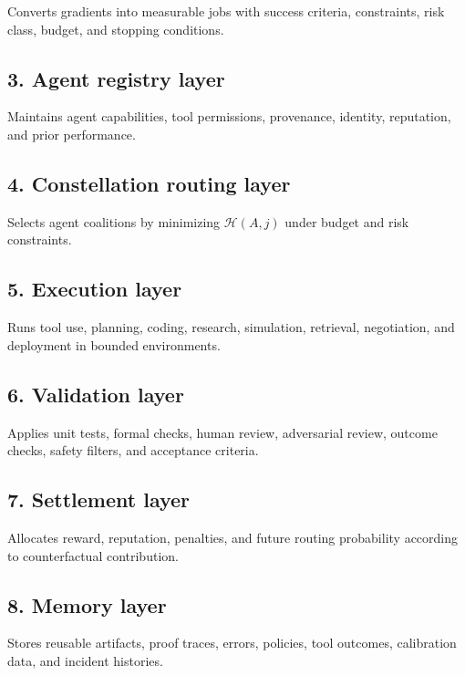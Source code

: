\documentclass[11pt]{article}
\begin{document}
Converts gradients into measurable jobs with success criteria, constraints, risk class, budget, and stopping conditions.

\subsection{3. Agent registry layer}\label{agent-registry-layer}

Maintains agent capabilities, tool permissions, provenance, identity, reputation, and prior performance.

\subsection{4. Constellation routing layer}\label{constellation-routing-layer}

Selects agent coalitions by minimizing \(\mathcal{H}(A,j)\) under budget and risk constraints.

\subsection{5. Execution layer}\label{execution-layer}

Runs tool use, planning, coding, research, simulation, retrieval, negotiation, and deployment in bounded environments.

\subsection{6. Validation layer}\label{validation-layer}

Applies unit tests, formal checks, human review, adversarial review, outcome checks, safety filters, and acceptance criteria.

\subsection{7. Settlement layer}\label{settlement-layer}

Allocates reward, reputation, penalties, and future routing probability according to counterfactual contribution.

\subsection{8. Memory layer}\label{memory-layer}

Stores reusable artifacts, proof traces, errors, policies, tool outcomes, calibration data, and incident histories.
\end{document}
